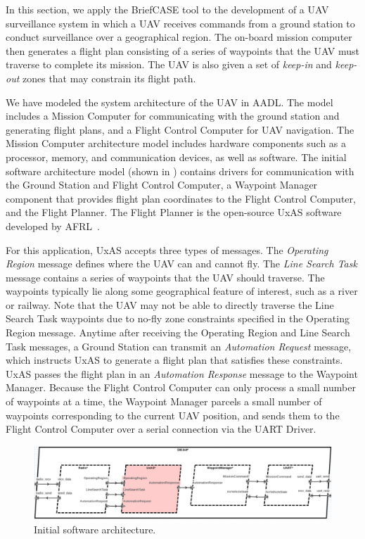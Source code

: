 In this section, we apply the BriefCASE tool to the development of a UAV surveillance system in which a UAV receives commands from a ground station to conduct surveillance over a geographical region. The on-board mission computer then generates a flight plan consisting of a series of waypoints that the UAV must traverse to complete its mission. The UAV is also given a set of \textit{keep-in} and \textit{keep-out} zones that may constrain its flight path.

We have modeled the system architecture of the UAV in AADL.  The model includes a Mission Computer for communicating with the ground station and generating flight plans, and a Flight Control Computer for UAV navigation.  The Mission Computer architecture model includes hardware components such as a processor, memory, and communication devices, as well as software.
%
The initial software architecture model (shown in ) contains drivers for communication with the Ground Station and Flight Control Computer, a Waypoint Manager component that provides flight plan coordinates to the Flight Control Computer, and the Flight Planner.  The Flight Planner is the open-source UxAS software developed by AFRL~\cite{uxas}. 

For this application, UxAS accepts three types of messages.  The \textit{Operating Region} message defines where the UAV can and cannot fly.  The \textit{Line Search Task} message contains a series of waypoints that the UAV should traverse.  The waypoints typically lie along some geographical feature of interest, such as a river or railway.  Note that the UAV may not be able to directly traverse the Line Search Task waypoints due to no-fly zone constraints specified in the Operating Region message.  Anytime after receiving the Operating Region and Line Search Task messages, a Ground Station can transmit an \textit{Automation Request} message, which instructs UxAS to generate a flight plan that satisfies these constraints.  UxAS passes the flight plan in an \textit{Automation Response} message to the Waypoint Manager.  Because the Flight Control Computer can only process a small number of waypoints at a time, the Waypoint Manager parcels a small number of waypoints corresponding to the current UAV position, and sends them to the Flight Control Computer over a serial connection via the UART Driver.

\begin{figure}[h]
	\centering
	\includegraphics[width=1\columnwidth]{figs/sw-initial.png}
	\caption{Initial software architecture.} 
	\label{fig:sw-initial} 
\end{figure}

